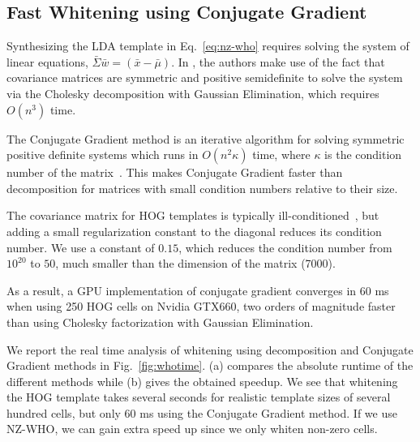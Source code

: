 \subsection{Fast Whitening using Conjugate Gradient}
\label{sec:fastwhiten}

Synthesizing the LDA template in Eq.~\ref{eq:nz-who} requires solving the system of
linear equations, $\bar{\Sigma} \bar{w} = (\bar{x} - \bar{\mu})$. In
\cite{Hariharan12}, the authors make use of the fact that covariance matrices
are symmetric and positive semidefinite to solve the system via the Cholesky
decomposition with Gaussian Elimination, which requires $O(n^3)$ time.

The Conjugate Gradient method is an iterative algorithm for solving symmetric
positive definite systems which runs in $O(n^2\kappa)$ time, where $\kappa$ is
the condition number of the matrix~\cite{Shewchuk94}.
%
This makes Conjugate Gradient faster than decomposition for matrices with small
condition numbers relative to their size.

The covariance matrix for HOG templates is typically
ill-conditioned~\cite{Hariharan12}, but adding a small regularization constant to
the diagonal reduces its condition number.
We use a constant of $0.15$, which reduces the condition number from $10^{20}$
to $50$, much smaller than the dimension of the matrix (7000).

As a result, a GPU implementation of conjugate gradient converges in 60
ms when using 250 HOG cells on Nvidia GTX660, two orders of magnitude faster
than using Cholesky factorization with Gaussian Elimination.

We report the real time analysis of whitening using decomposition and
Conjugate Gradient methods in Fig.~\ref{fig:whotime}. (a) compares the
absolute runtime of the different methods while (b) gives the obtained
speedup. We see that %
whitening the HOG template takes several seconds for realistic template sizes of
several hundred cells, but only 60 ms using the Conjugate Gradient
method. If we use NZ-WHO, we can gain extra speed
up since we only whiten non-zero cells.

